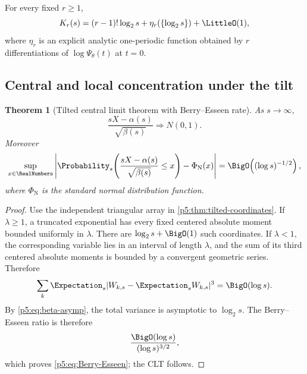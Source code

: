 \documentclass[11pt]{article}
\numberwithin{equation}{section}
\newtheorem{theorem}{Theorem}[section]
\theoremstyle{definition}
\theoremstyle{remark}
\begin{document}
\begin{corollary}\label{p5:cor:tilted-cumulants}
For every fixed $r\ge1$,
\begin{equation}\label{p5:eq:Kr-asymp}
 K_r(s)=(r-1)!\log_2s+
 \eta_r(\{\log_2s\})+\LittleO(1),
\end{equation}
where $\eta_r$ is an explicit analytic one-periodic function obtained by
$r$ differentiations of $\log\Psi_\theta(t)$ at $t=0$.
\end{corollary}

\subsection{Central and local concentration under the tilt}

\begin{theorem}[Tilted central limit theorem with Berry--Esseen rate]
\label{p5:thm:tilted-CLT}
As $s\to\infty$,
\begin{equation}\label{p5:eq:tilted-CLT}
 \frac{sX-\alpha(s)}{\sqrt{\beta(s)}}
 \Longrightarrow N(0,1).
\end{equation}
Moreover
\begin{equation}\label{p5:eq:Berry-Esseen}
 \sup_{x\in\RealNumbers}
 \left|\Probability_s\!\left(
 \frac{sX-\alpha(s)}{\sqrt{\beta(s)}}\le x\right)-\Phi_{\mathrm N}(x)\right|
 =\BigO\!\left((\log s)^{-1/2}\right),
\end{equation}
where $\Phi_{\mathrm N}$ is the standard normal distribution function.
\end{theorem}

\begin{proof}
Use the independent triangular array in \cref{p5:thm:tilted-coordinates}.  If
$\lambda\ge1$, a truncated exponential has every fixed centered absolute
moment bounded uniformly in $\lambda$.  There are $\log_2s+\BigO(1)$ such
coordinates.  If $\lambda<1$, the corresponding variable lies in an interval
of length $\lambda$, and the sum of its third centered absolute moments is
bounded by a convergent geometric series.  Therefore
\begin{equation}\label{p5:eq:third-abs-sum}
 \sum_k\Expectation_s|W_{k,s}-\Expectation_sW_{k,s}|^3=\BigO(\log s).
\end{equation}
By \cref{p5:eq:beta-asymp}, the total variance is asymptotic to $\log_2s$.
The Berry--Esseen ratio is therefore
\[
 \frac{\BigO(\log s)}{(\log s)^{3/2}},
\]
which proves \cref{p5:eq:Berry-Esseen}; the CLT follows.
\end{proof}
\end{document}
